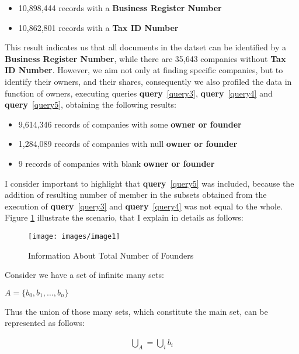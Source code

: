\begin{spacing}{1.5}
	\begin{itemize}
		\item 10,898,444 records with a \textbf{Business Register Number}
		\item 10,862,801 records with a \textbf{Tax ID Number}
	\end{itemize}
	
	This result indicates us that all documents in the datset can be identified by a \textbf{Business Register Number}, while there are 35,643 companies without \textbf{Tax ID Number}. However, we aim not only at finding specific companies, but to identify their owners, and their shares, consequently we also profiled the data in function of owners, executing queries \textbf{query}~\ref{query3}, \textbf{query}~\ref{query4} and \textbf{query}~\ref{query5},  obtaining the following results:
	
	\begin{itemize}
		\item 9,614,346 records of companies with some  \textbf{owner or founder}
		\item 1,284,089 records of companies with null \textbf{owner or founder}
		\item 9 records of companies with blank \textbf{owner or founder}
	\end{itemize}
	
	I consider important to highlight that  \textbf{query}~\ref{query5} was included, because the addition of  resulting number of member in the subsets obtained from the execution of \textbf{query}~\ref{query3} and \textbf{query}~\ref{query4} was not equal to the whole. Figure \ref{figure1} illustrate the scenario, that I explain in details as follows:  
	
	
	\begin{figure}
		\centering
		\texttt{[image: images/image1]}
		\caption{Information About Total Number of Founders}\label{figure1}
	\end{figure}
	
	
	Consider we have a set of infinite many sets:
	
	$A = \{b_0, b_1, \dots, b_n\}$
	
	Thus the union of those many sets, which constitute the main set, can be represented as follows:
	
	
	\begin{equation} \label{eq1}
	\begin{split}
	\bigcup_{A} = \bigcup_{i} b_{i}
	\end{split}
	\end{equation}


\end{spacing}
